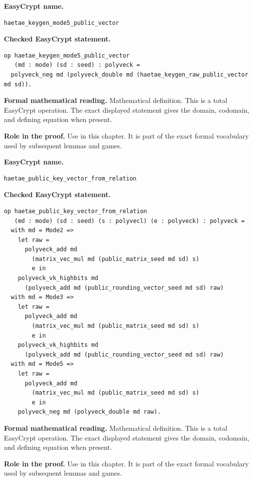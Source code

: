 \begin{formaldefinition}
\noindent\textbf{EasyCrypt name.}
\begin{lstlisting}[language=EasyCrypt,basicstyle=\ttfamily\scriptsize]
haetae_keygen_mode5_public_vector
\end{lstlisting}
\noindent\textbf{Checked EasyCrypt statement.}
\begin{lstlisting}[language=EasyCrypt,basicstyle=\ttfamily\scriptsize]
op haetae_keygen_mode5_public_vector
   (md : mode) (sd : seed) : polyveck =
  polyveck_neg md (polyveck_double md (haetae_keygen_raw_public_vector md sd)).
\end{lstlisting}
\noindent\textbf{Formal mathematical reading.}
Mathematical definition. This is a total EasyCrypt operation.  The exact displayed statement gives the domain, codomain, and defining equation when present.

\noindent\textbf{Role in the proof.}
Use in this chapter. It is part of the exact formal vocabulary used by subsequent lemmas and games.

\end{formaldefinition}

\begin{formaldefinition}
\noindent\textbf{EasyCrypt name.}
\begin{lstlisting}[language=EasyCrypt,basicstyle=\ttfamily\scriptsize]
haetae_public_key_vector_from_relation
\end{lstlisting}
\noindent\textbf{Checked EasyCrypt statement.}
\begin{lstlisting}[language=EasyCrypt,basicstyle=\ttfamily\scriptsize]
op haetae_public_key_vector_from_relation
   (md : mode) (sd : seed) (s : polyvecl) (e : polyveck) : polyveck =
  with md = Mode2 =>
    let raw =
      polyveck_add md
        (matrix_vec_mul md (public_matrix_seed md sd) s)
        e in
    polyveck_vk_highbits md
      (polyveck_add md (public_rounding_vector_seed md sd) raw)
  with md = Mode3 =>
    let raw =
      polyveck_add md
        (matrix_vec_mul md (public_matrix_seed md sd) s)
        e in
    polyveck_vk_highbits md
      (polyveck_add md (public_rounding_vector_seed md sd) raw)
  with md = Mode5 =>
    let raw =
      polyveck_add md
        (matrix_vec_mul md (public_matrix_seed md sd) s)
        e in
    polyveck_neg md (polyveck_double md raw).
\end{lstlisting}
\noindent\textbf{Formal mathematical reading.}
Mathematical definition. This is a total EasyCrypt operation.  The exact displayed statement gives the domain, codomain, and defining equation when present.

\noindent\textbf{Role in the proof.}
Use in this chapter. It is part of the exact formal vocabulary used by subsequent lemmas and games.

\end{formaldefinition}

